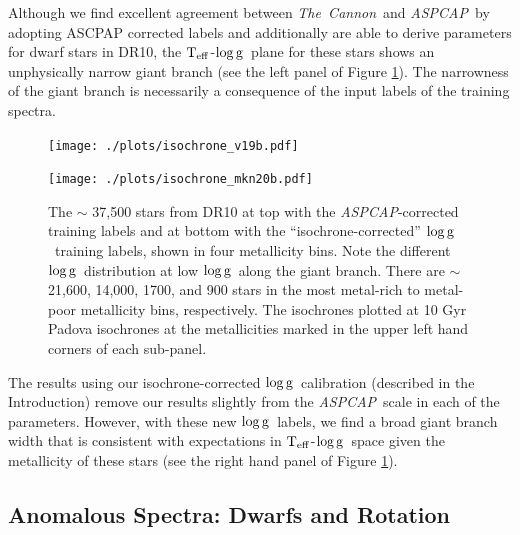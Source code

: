 \documentclass[12pt, preprint]{aastex}
\newcommand{\teff}{\mbox{$\rm T_{eff}$}}
\newcommand{\logg}{\mbox{$\rm \log g$}}
\newcommand{\tc}{\textsl{The~Cannon}}
\newcommand{\apogee}{\textsl{APOGEE}}
\newcommand{\aspcap}{\textsl{ASPCAP}}
\begin{document}
Although we find excellent agreement between \tc\ and \aspcap\ by adopting ASCPAP corrected labels and additionally are able to derive parameters for dwarf stars in DR10, the \teff-\logg\ plane for these stars shows an unphysically narrow giant branch  (see the left panel of Figure \ref{fig:iso}). The narrowness of the giant branch is necessarily a consequence of the input labels of the training spectra. 

\begin{figure}[!h]
\centering
  \vspace{-15pt}
  \texttt{[image: ./plots/isochrone\_v19b.pdf]}

    \texttt{[image: ./plots/isochrone\_mkn20b.pdf]}
\caption{The $\sim$ 37,500 stars from DR10 at top with the \aspcap-corrected training labels and at bottom with the ``isochrone-corrected'' \logg\ training labels, shown in four metallicity bins. Note the different \logg\ distribution at low \logg\ along the giant branch. There are $\sim$ 21,600, 14,000, 1700, and 900 stars in the most metal-rich to metal-poor metallicity bins, respectively. The isochrones plotted at 10 Gyr Padova isochrones at the metallicities marked in the upper left hand corners of each sub-panel.}
\label{fig:iso}
\end{figure}


The results using our isochrone-corrected \logg\ calibration (described in the Introduction) remove our results slightly from the \aspcap\ scale in each of the parameters. However, with these new \logg\ labels, we find a broad giant branch width that is consistent with expectations in \teff-\logg\ space given the metallicity of these stars (see the right hand panel of Figure \ref{fig:iso}).





\subsection{Anomalous Spectra: Dwarfs and Rotation}
\end{document}

